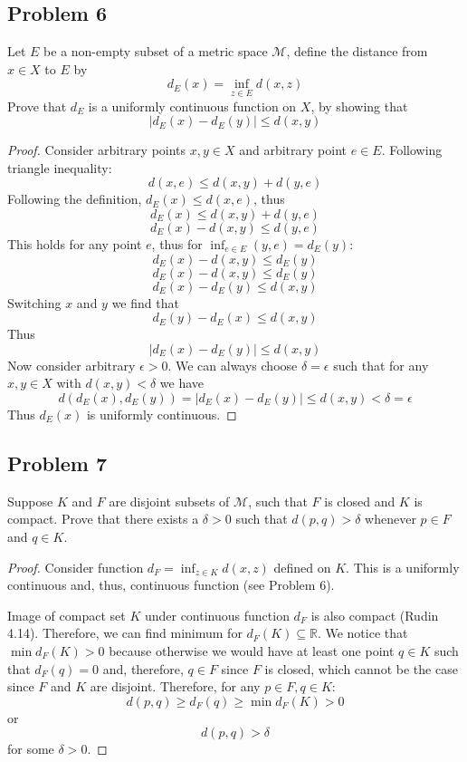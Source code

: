 \documentclass{article}
\begin{document}
\subsection*{Problem 6}

\begin{tcolorbox}
Let $E$ be a non-empty subset of a metric space $\mathcal{M}$, define the distance from $x \in X$ to $E$ by
$$ d_E(x) = \inf_{z \in E} d(x,z) $$
Prove that $d_E$ is a uniformly continuous function on $X$, by showing that
$$ | d_E(x) - d_E(y) | \leq d(x,y) $$
\end{tcolorbox}
\begin{proof}
Consider arbitrary points $x,y \in X$ and arbitrary point $e \in E$. Following triangle inequality:
$$ d(x,e) \leq d(x,y) + d(y,e) $$
Following the definition, $d_E(x) \leq d(x,e)$, thus 
$$ d_E(x) \leq d(x,y) + d(y,e) $$
$$ d_E(x) - d(x,y) \leq d(y,e) $$
This holds for any point $e$, thus for $\inf_{e \in E}(y,e) = d_E(y)$:
$$ d_E(x) - d(x,y) \leq d_E(y) $$
$$ d_E(x) - d(x,y) \leq d_E(y) $$
$$ d_E(x) - d_E(y) \leq d(x,y) $$
Switching $x$ and $y$ we find that
$$ d_E(y) - d_E(x) \leq d(x,y) $$
Thus
$$ | d_E(x) - d_E(y) | \leq d(x,y) $$
Now consider arbitrary $\epsilon > 0$. We can always choose $\delta = \epsilon$ such that for any $x,y \in X$ with $d(x,y)<\delta$ we have
$$ d(d_E(x), d_E(y)) = |d_E(x)-d_E(y)| \leq d(x,y) < \delta = \epsilon $$
Thus $d_E(x)$ is uniformly continuous.

\end{proof}


\subsection*{Problem 7}

\begin{tcolorbox}
Suppose $K$ and $F$ are disjoint subsets of $\mathcal{M}$, such that $F$ is closed and $K$ is compact. Prove that there exists a $\delta > 0$ such that $d (p, q) > \delta$ whenever $p \in F$ and $q \in K$.
\end{tcolorbox}
\begin{proof}
Consider function $d_F=\inf_{z \in K} d(x,z)$ defined on $K$. This is a uniformly continuous and, thus, continuous function (see Problem 6).

Image of compact set $K$ under continuous function $d_F$ is also compact (Rudin 4.14). Therefore, we can find minimum for $d_F(K) \subseteq \mathbb{R}$. We notice that $\min d_F(K) > 0$ because otherwise we would have at least one point $q \in K$ such that $d_F(q) = 0$ and, therefore, $q \in F$ since $F$ is closed, which cannot be the case since $F$ and $K$ are disjoint. Therefore, for any $p \in F, q \in K$:
$$ d(p,q) \geq d_F(q) \geq \min d_F(K) > 0 $$
or 
$$ d(p,q) > \delta$$
for some $\delta > 0$.
\end{proof}
\end{document}
